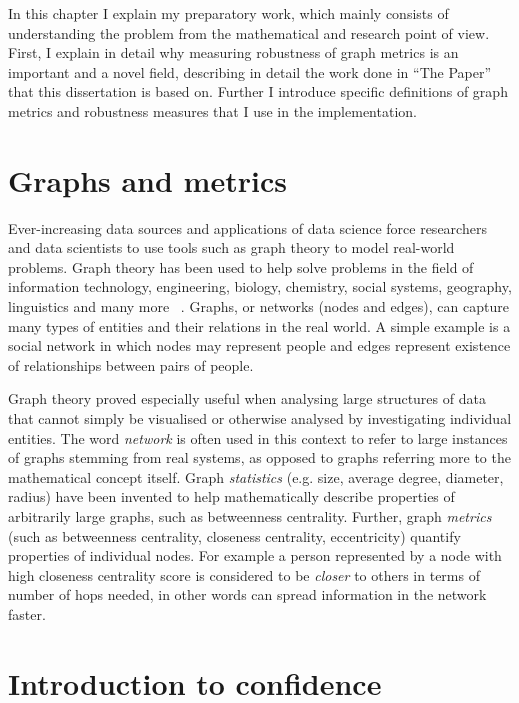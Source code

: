 In this chapter I explain my preparatory work, which mainly consists of understanding the problem from the mathematical and research point of view.
First, I explain in detail why measuring robustness of graph metrics is an important and a novel field, describing in detail the work done in ``The Paper'' that this dissertation is based on.
Further I introduce specific definitions of graph metrics and robustness measures that I use in the implementation.


\section{Graphs and metrics}

Ever-increasing data sources and applications of data science force researchers and data scientists to use tools such as graph theory to model real-world problems.
Graph theory has been used to help solve problems in the field of information technology, engineering, biology, chemistry, social systems, geography, linguistics and many more ~\cite{FouldsGraphTheoryApplications2012}.
Graphs, or networks (nodes and edges), can capture many types of entities and their relations in the real world.
A simple example is a social network in which nodes may represent people and edges represent existence of relationships between pairs of people.

Graph theory proved especially useful when analysing large structures of data that cannot simply be visualised or otherwise analysed by investigating individual entities.
The word \textsl{network} is often used in this context to refer to large instances of graphs stemming from real systems, as opposed to graphs referring more to the mathematical concept itself.
Graph \textsl{statistics} (e.g. size, average degree, diameter, radius) have been invented to help mathematically describe properties of arbitrarily large graphs, such as betweenness centrality.
Further, graph \textsl{metrics} (such as betweenness centrality, closeness centrality, eccentricity) quantify properties of individual nodes.
For example a person represented by a node with high closeness centrality score is considered to be \textsl{closer} to others in terms of number of hops needed, in other words can spread information in the network faster.


\section{Introduction to confidence}

